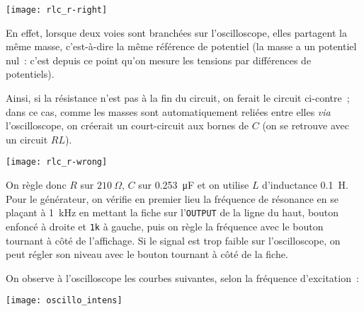 \documentclass[a4paper, 11pt, final, garamond]{book}
\begin{document}
\begin{enumerate}[label=\sqenumi]
        \begin{minipage}{0.40\linewidth}
            \begin{center}
                \texttt{[image: rlc\_r-right]}
            \end{center}
        \end{minipage}
        \hfill
        \begin{minipage}{0.55\linewidth}
            En effet, lorsque deux voies sont branchées sur l'oscilloscope, elles
            partagent la même masse, c'est-à-dire la même référence de potentiel (la
            masse a un potentiel nul~: c'est depuis ce point qu'on mesure les
            tensions par différences de potentiels).
        \end{minipage}
        \begin{minipage}{0.55\linewidth}
            Ainsi, si la résistance n'est pas à la fin du circuit, on ferait le
            circuit ci-contre~; dans ce cas, comme les masses sont
            automatiquement reliées entre elles \textit{via} l'oscilloscope, on
            créerait un court-circuit aux bornes de $C$ (on se retrouve avec un
            circuit $RL$).
        \end{minipage}
        \hfill
        \begin{minipage}{0.40\linewidth}
            \vspace{-10pt}
            \begin{center}
                \texttt{[image: rlc\_r-wrong]}
            \end{center}
        \end{minipage}

        On règle donc $R$ sur $\SI{210}{\Omega}$, $C$ sur \SI{0.253}{\micro F}
        et on utilise $L$ d'inductance \SI{0.1}{H}. Pour le générateur, on
        vérifie en premier lieu la fréquence de résonance en se plaçant à
        \SI{1}{kHz} en mettant la fiche sur l'\texttt{OUTPUT} de la ligne du
        haut, bouton \fbox{$\sim$} enfoncé à droite et \texttt{1k} à gauche,
        puis on règle la fréquence avec le bouton tournant à côté de
        l'affichage. Si le signal est trop faible sur l'oscilloscope, on peut
        régler son niveau avec le bouton tournant à côté de la fiche.
\end{enumerate}

On observe à l'oscilloscope les courbes suivantes, selon la fréquence
d'excitation~:
\begin{center}
    \texttt{[image: oscillo\_intens]}
\end{center}
\end{document}
